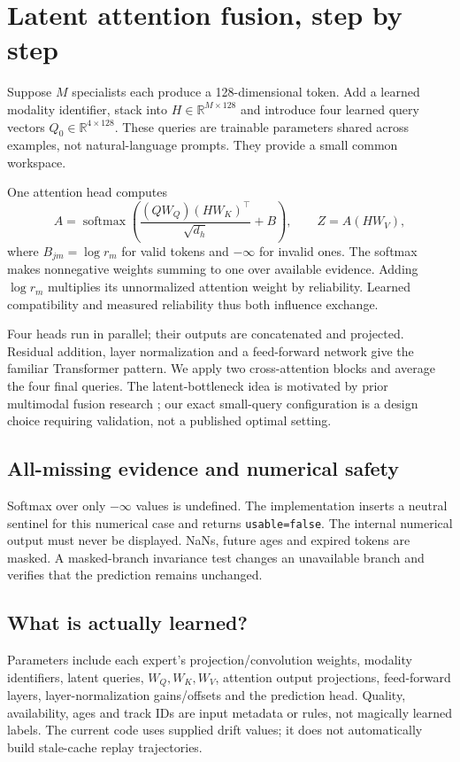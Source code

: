 \documentclass[10pt,a4paper]{article}
\newcommand{\R}{\mathbb{R}}
\newcommand{\softmax}{\operatorname{softmax}}
\begin{document}
\section{Latent attention fusion, step by step}
Suppose $M$ specialists each produce a 128-dimensional token. Add a learned modality identifier, stack into $H\in\R^{M\times128}$ and introduce four learned query vectors $Q_0\in\R^{4\times128}$. These queries are trainable parameters shared across examples, not natural-language prompts. They provide a small common workspace.

One attention head computes
\begin{equation}
A=\softmax\left(\frac{(QW_Q)(HW_K)^\top}{\sqrt{d_h}}+B\right),
\qquad Z=A(HW_V),
\end{equation}
where $B_{jm}=\log r_m$ for valid tokens and $-\infty$ for invalid ones. The softmax makes nonnegative weights summing to one over available evidence. Adding $\log r_m$ multiplies its unnormalized attention weight by reliability. Learned compatibility and measured reliability thus both influence exchange.

Four heads run in parallel; their outputs are concatenated and projected. Residual addition, layer normalization and a feed-forward network give the familiar Transformer pattern. We apply two cross-attention blocks and average the four final queries. The latent-bottleneck idea is motivated by prior multimodal fusion research \cite{mbt}; our exact small-query configuration is a design choice requiring validation, not a published optimal setting.

\subsection{All-missing evidence and numerical safety}
Softmax over only $-\infty$ values is undefined. The implementation inserts a neutral sentinel for this numerical case and returns \texttt{usable=false}. The internal numerical output must never be displayed. NaNs, future ages and expired tokens are masked. A masked-branch invariance test changes an unavailable branch and verifies that the prediction remains unchanged.

\subsection{What is actually learned?}
Parameters include each expert's projection/convolution weights, modality identifiers, latent queries, $W_Q,W_K,W_V$, attention output projections, feed-forward layers, layer-normalization gains/offsets and the prediction head. Quality, availability, ages and track IDs are input metadata or rules, not magically learned labels. The current code uses supplied drift values; it does not automatically build stale-cache replay trajectories.
\end{document}
